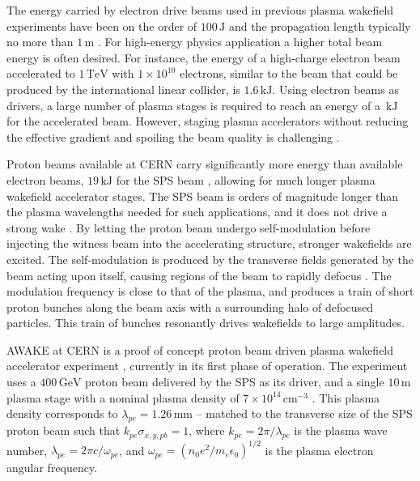\documentclass[aps,prstab,reprint,amsmath,amssymb,groupedaddress]{revtex4-1}
\newcommand{\unit}[1]{\,\mathrm{#1}}
\newcommand{\nexp}[1]{\times 10^{#1}}
\begin{document}
The energy carried by electron drive beams used in previous plasma wakefield experiments have been on the order of
$100\unit{J}$ and the propagation length typically no more than $1\unit{m}$ \cite{blumenfeld:2007, caldwell:2009}.
For high-energy physics application a higher total beam energy is often desired. For instance, the energy of a
high-charge electron beam accelerated to $1\unit{TeV}$ with $1\nexp{10}$ electrons, similar to the beam that could be
produced by the international linear collider, is $1.6\unit{kJ}$. Using electron beams as drivers, a large number of
plasma stages is required to reach an energy of a $\unit{kJ}$ for the accelerated beam. However, staging plasma
accelerators without reducing the effective gradient and spoiling the beam quality is challenging
\cite{steinke:2016, lindstrom:2016}.

Proton beams available at CERN carry significantly more energy than available electron beams, $19\unit{kJ}$ for the SPS
beam \cite{gschwendtner:2016}, allowing for much longer plasma wakefield accelerator stages. The SPS beam is orders of
magnitude longer than the plasma wavelengths needed for such applications, and it does not drive a strong wake
\cite{gschwendtner:2016}. By letting the proton beam undergo self-modulation before injecting the witness beam into the
accelerating structure, stronger wakefields are excited. The self-modulation is produced by the transverse fields
generated by the beam acting upon itself, causing regions of the beam to rapidly defocus \cite{kumar:2010}. The
modulation frequency is close to that of the plasma, and produces a train of short proton bunches along the beam axis
with a surrounding halo of defocused particles. This train of bunches resonantly drives wakefields to large amplitudes.

AWAKE at CERN is a proof of concept proton beam driven plasma wakefield accelerator experiment
\cite{awake_collaboration:2014}, currently in its first phase of operation. The experiment uses a $400\unit{GeV}$ proton
beam delivered by the SPS as its driver, and a single $10\unit{m}$ plasma stage with a nominal plasma density of
$7\nexp{14}\unit{cm}^{-3}$ \cite{gschwendtner:2016}. This plasma density corresponds to $\lambda_{pe} = 1.26\unit{mm}$
-- matched to the transverse size of the SPS proton beam such that $k_{pe}\sigma_{x,y,pb} = 1$, where
$k_{pe} = 2\pi/\lambda_{pe}$ is the plasma wave number, $\lambda_{pe} = 2\pi c/\omega_{pe}$, and
$\omega_{pe} = \left(n_0e^2/m_e\epsilon_0\right)^{1/2}$ is the plasma electron angular frequency.
\end{document}

